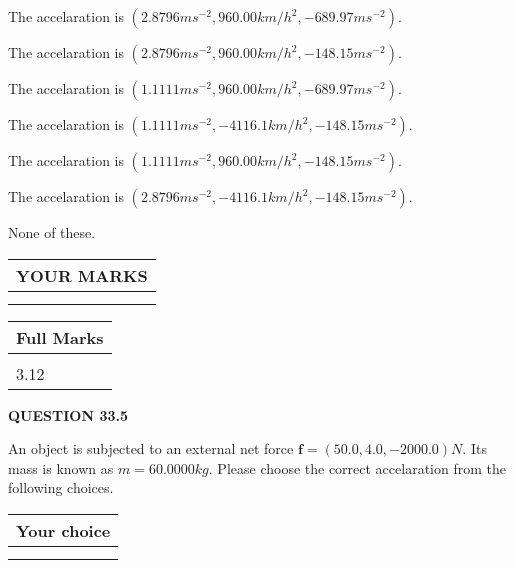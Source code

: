 \documentclass[12pt]{article}
\begin{document}
  
 
 
The accelaration is
$(
2.8796ms^{-2},
960.00km/h^2,
-689.97ms^{-2}
).
$
 
 
The accelaration is
$(
2.8796ms^{-2},
960.00km/h^2,
-148.15ms^{-2}
).
$
 
 
The accelaration is
$(
1.1111ms^{-2},
960.00km/h^2,
-689.97ms^{-2}
).
$
 
 
The accelaration is
$(
1.1111ms^{-2},
-4116.1km/h^2,
-148.15ms^{-2}
).
$
 
 
The accelaration is
$(
1.1111ms^{-2},
960.00km/h^2,
-148.15ms^{-2}
).
$
 
 
The accelaration is
$(
2.8796ms^{-2},
-4116.1km/h^2,
-148.15ms^{-2}
).
$
 
 
 None of these.
 
 
 
 

 
\vspace{0.3in}
  
\vspace{0.2in}
  
\noindent\begin{tabular}{|l|}
\hline
 YOUR MARKS  \\
\hline
 \\ 
 \\ 
\hline
\end{tabular}
\hspace{0.05in} \begin{tabular}{|l|}
\hline
 Full Marks  \\
\hline
 \\ 
3.12 \\
\hline
\end{tabular}
{\textbf{\Large{QUESTION
33.5 
}}}
  
  
 
 
An object is subjected to an external net force $\mathbf{f}=
(50.0 , 4.0 , -2000.0) N$.
Its mass is known as $m= %
60.0000 kg$. Please choose the
correct accelaration from the following choices.
 
  
  
\noindent\hspace{3.0in} \begin{tabular}{|l|}
\hline
Your choice \\
\hline
 \\ 
 \\ 
\hline
\end{tabular}
  
\end{document}
